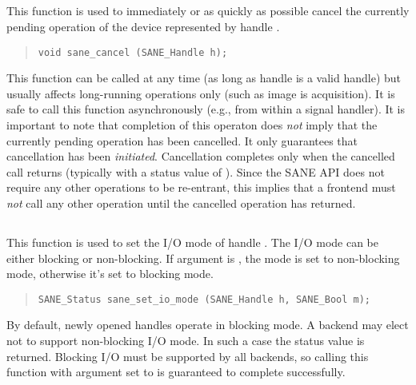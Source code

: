 \documentclass[11pt,DVIps]{report}
\begin{document}
\subsection{}

This function is used to immediately or as quickly as possible cancel
the currently pending operation of the device represented by handle
.
\begin{quote}
\begin{verbatim}
void sane_cancel (SANE_Handle h);
\end{verbatim}
\end{quote}
This function can be called at any time (as long as handle  is
a valid handle) but usually affects long-running operations only (such
as image is acquisition).  It is safe to call this function
asynchronously (e.g., from within a signal handler).  It is important
to note that completion of this operaton does {\em not\/} imply that
the currently pending operation has been cancelled.  It only
guarantees that cancellation has been {\em initiated}.  Cancellation
completes only when the cancelled call returns (typically with a
status value of ).  Since the SANE API
does not require any other operations to be re-entrant, this implies
that a frontend must {\em not\/} call any other operation until the
cancelled operation has returned.


\subsection{}

This function is used to set the I/O mode of handle .  The I/O
mode can be either blocking or non-blocking.  If argument  is
, the mode is set to non-blocking mode, otherwise
it's set to blocking mode.
\begin{quote}
\begin{verbatim}
SANE_Status sane_set_io_mode (SANE_Handle h, SANE_Bool m);
\end{verbatim}
\end{quote}
By default, newly opened handles operate in blocking mode.  A backend
may elect not to support non-blocking I/O mode.  In such a case the
status value  is returned.  Blocking
I/O must be supported by all backends, so calling this function with
argument  set to  is guaranteed to complete
successfully.
\end{document}
